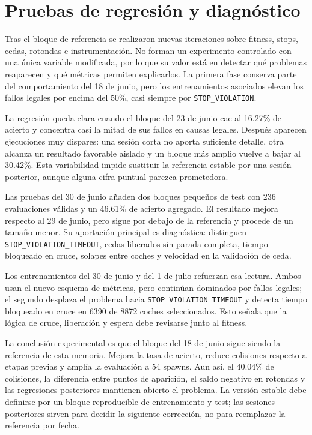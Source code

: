 \section{Pruebas de regresión y diagnóstico}

Tras el bloque de referencia se realizaron nuevas iteraciones sobre fitness, stops, cedas, rotondas e instrumentación. No forman un experimento controlado con una única variable modificada, por lo que su valor está en detectar qué problemas reaparecen y qué métricas permiten explicarlos. La primera fase conserva parte del comportamiento del 18 de junio, pero los entrenamientos asociados elevan los fallos legales por encima del 50\%, casi siempre por \texttt{STOP\_VIOLATION}.

La regresión queda clara cuando el bloque del 23 de junio cae al 16.27\% de acierto y concentra casi la mitad de sus fallos en causas legales. Después aparecen ejecuciones muy dispares: una sesión corta no aporta suficiente detalle, otra alcanza un resultado favorable aislado y un bloque más amplio vuelve a bajar al 30.42\%. Esta variabilidad impide sustituir la referencia estable por una sesión posterior, aunque alguna cifra puntual parezca prometedora.

Las pruebas del 30 de junio añaden dos bloques pequeños de test con 236 evaluaciones válidas y un 46.61\% de acierto agregado. El resultado mejora respecto al 29 de junio, pero sigue por debajo de la referencia y procede de un tamaño menor. Su aportación principal es diagnóstica: distinguen \texttt{STOP\_VIOLATION\_TIMEOUT}, cedas liberados sin parada completa, tiempo bloqueado en cruce, solapes entre coches y velocidad en la validación de ceda.

Los entrenamientos del 30 de junio y del 1 de julio refuerzan esa lectura. Ambos usan el nuevo esquema de métricas, pero continúan dominados por fallos legales; el segundo desplaza el problema hacia \texttt{STOP\_VIOLATION\_TIMEOUT} y detecta tiempo bloqueado en cruce en 6390 de 8872 coches seleccionados. Esto señala que la lógica de cruce, liberación y espera debe revisarse junto al fitness.

La conclusión experimental es que el bloque del 18 de junio sigue siendo la referencia de esta memoria. Mejora la tasa de acierto, reduce colisiones respecto a etapas previas y amplía la evaluación a 54 spawns. Aun así, el 40.04\% de colisiones, la diferencia entre puntos de aparición, el saldo negativo en rotondas y las regresiones posteriores mantienen abierto el problema. La versión estable debe definirse por un bloque reproducible de entrenamiento y test; las sesiones posteriores sirven para decidir la siguiente corrección, no para reemplazar la referencia por fecha.
